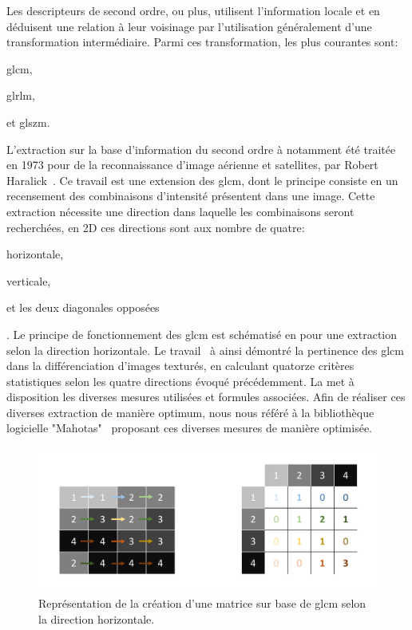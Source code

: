 Les descripteurs de second ordre, ou plus, utilisent l'information locale et en déduisent une relation à leur voisinage par l'utilisation généralement d'une transformation intermédiaire. Parmi ces transformation, les plus courantes sont: 
\begin{inlinerate}
    \item \gls{glcm},
    \item \gls{glrlm},
    \item et \gls{glszm}.
\end{inlinerate} 
L'extraction sur la base d'information du second ordre à notamment été traitée en 1973 pour de la reconnaissance d'image aérienne et satellites, par Robert Haralick~\cite{Haralick1973}. Ce travail est une extension des \gls{glcm}, dont le principe consiste en un recensement des combinaisons d'intensité présentent dans une image. Cette extraction nécessite une direction dans laquelle les combinaisons seront recherchées, en 2D ces directions sont aux nombre de quatre:
\begin{inlinerate}
    \item horizontale,
    \item verticale,
    \item et les deux diagonales opposées
\end{inlinerate}. Le principe de fonctionnement des \gls{glcm} est schématisé en  pour une extraction selon la direction horizontale. Le travail~\cite{Haralick1973} à ainsi démontré la pertinence des \gls{glcm} dans la différenciation d'images texturés, en calculant quatorze critères statistiques selon les quatre directions évoqué précédemment. La  met à disposition les diverses mesures utilisées et formules associées. Afin de réaliser ces diverses extraction de manière optimum, nous nous référé à la bibliothèque logicielle "Mahotas"~\cite{coelho2012} proposant ces diverses mesures de manière optimisée.\par
 
\begin{figure}[H]
    \centering
    \includegraphics[width=0.8\linewidth]{contents/chapter_4/resources/scheme_principle_GLCM.pdf}
    \caption{Représentation de la création d'une matrice sur base de \gls{glcm} selon la direction horizontale.}
    \label{fig:scheme_principle_GLCM}
\end{figure}\par

